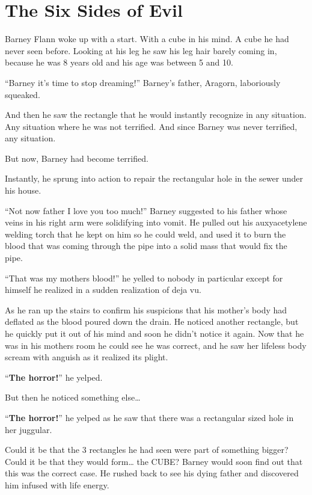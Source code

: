 \chapter{The Six Sides of Evil}


Barney Flann woke up with a start. With a cube in his mind. A cube
he had never seen before. Looking at his leg he saw his leg hair
barely coming in, because he was 8 years old and his age was
between 5 and 10.

``Barney it's time to stop dreaming!'' Barney's father, Ara\-gorn,
laboriously squeaked.

And then he saw the rectangle that he would instantly recognize in
any situation. Any situation where he was not terrified. And since
Barney was never terrified, any situation.

But now, Barney had become terrified.

Instantly, he sprung into action to repair the rectangular hole in
the sewer under his house.

``Not now father I love you too much!'' Barney suggested to his
father whose veins in his right arm were solidifying into vomit. He
pulled out his auxyacetylene welding torch that he kept on him so
he could weld, and used it to burn the blood that was coming
through the pipe into a solid mass that would fix the pipe.

``That was my mothers blood!'' he yelled to nobody in particular
except for himself he realized in a sudden realization of deja
vu.

As he ran up the stairs to confirm his suspicions that his mother's
body had deflated as the blood poured down the drain. He noticed
another rectangle, but he quickly put it out of his mind and soon
he didn't notice it again. Now that he was in his mothers room he
could see he was correct, and he saw her lifeless body scream with
anguish as it realized its plight.

``{\bf The horror!}'' he yelped.

But then he noticed something else{\ldots}

``{\bf The horror!}'' he yelped as he saw that there was a rectangular
sized hole in her juggular.

Could it be that the 3 rectangles he had seen were part of
something bigger? Could it be that they would form{\ldots} the CUBE?
Barney would soon find out that this was the correct case. He
rushed back to see his dying father and discovered him infused with
life energy.

